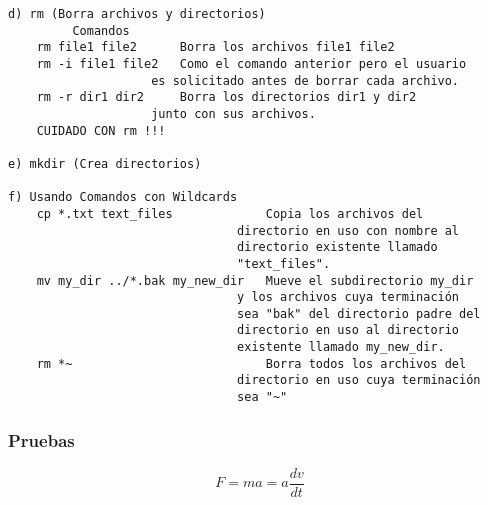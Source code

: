 \documentclass{article}
\begin{document}
\begin{verbatim}
d) rm (Borra archivos y directorios)
	     Comandos
	rm file1 file2      Borra los archivos file1 file2
	rm -i file1 file2   Como el comando anterior pero el usuario
                    es solicitado antes de borrar cada archivo.
	rm -r dir1 dir2     Borra los directorios dir1 y dir2 
                    junto con sus archivos.
	CUIDADO CON rm !!!

e) mkdir (Crea directorios)

f) Usando Comandos con Wildcards
	cp *.txt text_files             Copia los archivos del 
                                directorio en uso con nombre al 
                                directorio existente llamado 
                                "text_files".
	mv my_dir ../*.bak my_new_dir   Mueve el subdirectorio my_dir
                                y los archivos cuya terminación
                                sea "bak" del directorio padre del
                                directorio en uso al directorio
                                existente llamado my_new_dir.
	rm *~                           Borra todos los archivos del 
                                directorio en uso cuya terminación
                                sea "~"

\end{verbatim}
\subsubsection{Pruebas}
\begin{equation}
F=ma=a \frac{dv}{dt}
\end{equation}
\end{document}
